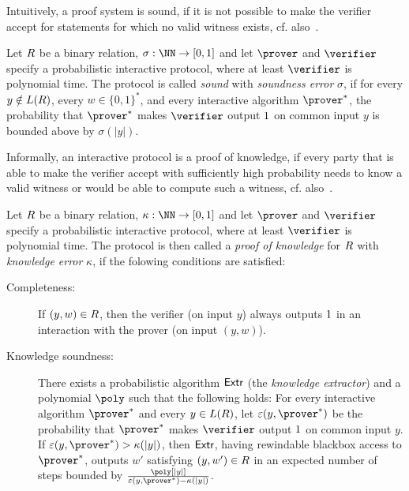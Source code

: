 \documentclass[runningheads]{llncs}
\begin{document}
Intuitively, a proof system is sound, if it is not possible to make the verifier accept for statements for which no valid witness exists, cf. also~\cite[1.6.2]{zkproof-reference}.
\begin{definition}\label{def:soundness}
  Let $R$ be a binary relation, $\sigma:\NN\to[0,1]$ and let $\prover$ and $\verifier$ specify a probabilistic interactive protocol, where at least $\verifier$ is polynomial time.
  The protocol is called \emph{sound} with \emph{soundness error} $\sigma$, if for every $y\notin L(R)$, every $w\in\{0,1\}^*$, and every interactive algorithm $\prover^*$, the probability that $\prover^*$ makes $\verifier$ output $1$ on common input $y$ is bounded above by $\sigma(|y|)$. 
\end{definition}

Informally, an interactive protocol is a proof of knowledge, if every party that is able to make the verifier accept with sufficiently high probability needs to know a valid witness or would be able to compute such a witness, cf. also~\cite[1.6.3]{zkproof-reference}.
\begin{definition}\label{def:pok}
  Let $R$ be a binary relation, $\kappa:\NN\to[0,1]$ and let $\prover$ and $\verifier$ specify a probabilistic interactive protocol, where at least $\verifier$ is polynomial time.
  The protocol is then called a \emph{proof of knowledge} for $R$ with \emph{knowledge error} $\kappa$, if the folowing conditions are satisfied:
  \begin{description}
    \item[Completeness:]
      If $(y,w)\in R$, then the verifier (on input $y$) always outputs $1$ in an interaction with the prover (on input $(y,w)$).
    \item[Knowledge soundness:]
      There exists a probabilistic algorithm $\mathsf{Extr}$ (the \emph{knowledge extractor}) and a polynomial $\poly$ such that the following holds:
      For every interactive algorithm $\prover^*$ and every $y\in L(R)$, let $\varepsilon(y,\prover^*)$ be the probability that $\prover^*$ makes $\verifier$ output $1$ on common input $y$.
      If $\varepsilon(y,\prover^*)>\kappa(|y|)$, then $\mathsf{Extr}$, having rewindable blackbox access to $\prover^*$, outputs $w'$ satisfying $(y,w')\in R$ in an expected number of steps bounded by $\frac{\poly[|y|]}{\varepsilon(y,\prover^*)-\kappa(|y|)}$.
  \end{description}
\end{definition}
\end{document}
